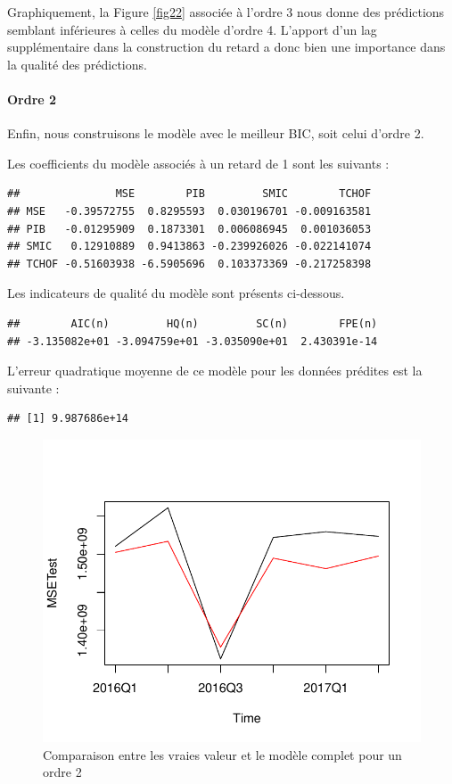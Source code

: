 \documentclass[11pt,]{article}
\let\oldparagraph\paragraph
\renewcommand{\paragraph}[1]{\oldparagraph{#1}\mbox{}}
\begin{document}
Graphiquement, la Figure \ref{fig22} associée à l'ordre 3 nous donne des
prédictions semblant inférieures à celles du modèle d'ordre 4. L'apport
d'un lag supplémentaire dans la construction du retard a donc bien une
importance dans la qualité des prédictions.

\paragraph{Ordre 2}\label{ordre-2}

Enfin, nous construisons le modèle avec le meilleur BIC, soit celui
d'ordre 2.

Les coefficients du modèle associés à un retard de 1 sont les suivants :

\begin{verbatim}
##               MSE        PIB         SMIC        TCHOF
## MSE   -0.39572755  0.8295593  0.030196701 -0.009163581
## PIB   -0.01295909  0.1873301  0.006086945  0.001036053
## SMIC   0.12910889  0.9413863 -0.239926026 -0.022141074
## TCHOF -0.51603938 -6.5905696  0.103373369 -0.217258398
\end{verbatim}

Les indicateurs de qualité du modèle sont présents ci-dessous.

\begin{verbatim}
##        AIC(n)         HQ(n)         SC(n)        FPE(n) 
## -3.135082e+01 -3.094759e+01 -3.035090e+01  2.430391e-14
\end{verbatim}

L'erreur quadratique moyenne de ce modèle pour les données prédites est
la suivante :

\begin{verbatim}
## [1] 9.987686e+14
\end{verbatim}

\begin{figure}[htbp]
\centering
\includegraphics{doc_files/figure-latex/unnamed-chunk-37-1.pdf}
\caption{\label{fig23} Comparaison entre les vraies valeur et le modèle
complet pour un ordre 2}
\end{figure}
\end{document}
